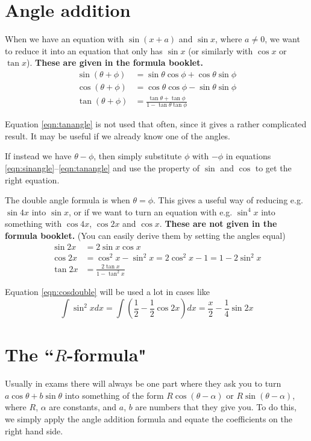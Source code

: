 \documentclass{article}
\begin{document}
\section{Angle addition}
When we have an equation with $\sin(x+a)$ and $\sin x$, where $a\neq 0$, we want to reduce it into an equation that only has $\sin x$ (or similarly with $\cos x$ or $\tan x$). \textbf{These are given in the formula booklet.}
\begin{align}
    \label{eqn:sinangle}
    \sin(\theta+\phi)&=\sin\theta\cos\phi+\cos\theta\sin\phi\\
    \label{eqn:cosangle}
    \cos(\theta+\phi)&=\cos\theta\cos\phi-\sin\theta\sin\phi\\
    \label{eqn:tanangle}
    \tan(\theta+\phi)&=\frac{\tan\theta+\tan\phi}{1-\tan\theta\tan\phi}
\end{align}

Equation \eqref{eqn:tanangle} is not used that often, since it gives a rather complicated result. It may be useful if we already know one of the angles.

If instead we have $\theta-\phi$, then simply substitute $\phi$ with $-\phi$ in equations \eqref{eqn:sinangle}--\eqref{eqn:tanangle} and use the property of $\sin$ and $\cos$ to get the right equation.

The double angle formula is when $\theta=\phi$. This gives a useful way of reducing e.g. $\sin4x$ into $\sin x$, or if we want to turn an equation with e.g. $\sin^4x$ into something with $\cos4x$, $\cos2x$ and $\cos x$. \textbf{These are not given in the formula booklet.} (You can easily derive them by setting the angles equal)
\begin{align}
    \sin2x&=2\sin x\cos x\\
    \label{eqn:cosdouble}
    \cos2x&=\cos^2x-\sin^2x = 2\cos^2x-1 = 1-2\sin^2x\\
    \tan2x&=\frac{2\tan x}{1-\tan^2x}
\end{align}

Equation \eqref{eqn:cosdouble} will be used a lot in cases like
\[
\int \sin^2x dx = \int\left(\frac{1}{2}-\frac{1}{2}\cos2x\right)dx = \frac{x}{2} - \frac{1}{4}\sin 2x
\]

\section{The ``$R$-formula"}
Usually in exams there will always be one part where they ask you to turn $a\cos\theta + b\sin\theta$ into something of the form $R\cos(\theta-\alpha)$ or $R\sin(\theta-\alpha)$, where $R$, $\alpha$ are constants, and $a$, $b$ are numbers that they give you. To do this, we simply apply the angle addition formula and equate the coefficients on the right hand side.
\end{document}
